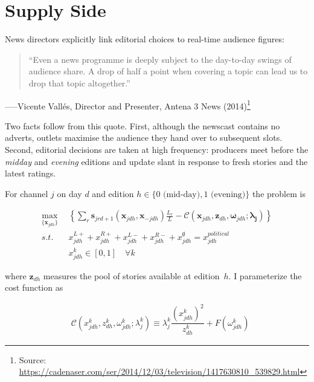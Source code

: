 \documentclass[12pt]{article}
\begin{document}
\section{Supply Side}


\label{sec:supply}

News directors explicitly link editorial choices to real-time audience figures:

\begin{quote}
	“Even a news programme is deeply subject to the day-to-day swings of audience share.  
	A drop of half a point when covering a topic can lead us to drop that topic altogether.”
\end{quote}
\hspace*{\fill}\small–––Vicente Vallés, Director and Presenter, Antena 3 News (2014)\footnote{Source: \url{https://cadenaser.com/ser/2014/12/03/television/1417630810_539829.html}}

Two facts follow from this quote. First, although the newscast contains no adverts, outlets maximise the audience they hand over to subsequent slots. Second, editorial decisions are taken at high frequency: producers meet before the \emph{midday} and \emph{evening} editions and update slant in response to fresh stories and the latest ratings.


For channel $j$ on day $d$ and edition $h\in\{0\text{ (mid-day)},1\text{ (evening)}\}$ the problem is



\begin{equation}\label{eq:payoffs}
	\begin{aligned}
		\max_{\{\mathbf{x}_{jdh}\}}   & \left\{   \sum_{r}\bm{s}_{jrd+1}(\bm{x}_{jdh}, \bm{x}_{-jdh})\frac{L_r}{L} -  \mathcal{C}\left(  \bm{x}_{jdh},\bm{z}_{dh}, \bm{\omega}_{jdh}; \bm{\lambda_j}   \right)    \right\}\\
		s.t.   \quad &   x_{jdh}^{L+} +x_{jdh}^{R+} + x_{jdh}^{L-} + x_{jdh}^{R-} + x_{jdh}^{\emptyset} = x_{jdh}^{political}\\
		& x_{jdh}^k \in [0,1] \quad \forall k
	\end{aligned}
\end{equation} 






where $\bm z_{dh}$ measures the pool of stories available at edition~$h$.  
I parameterize the cost function as

\begin{equation*}\label{}
	\begin{aligned}
		& \mathcal{C}(x_{jdh}^k,z_{dh}^k,\omega^k_{jdh}; \lambda_j^k )\equiv   \lambda_j^k  \dfrac{(x_{jdh}^k)^2}{z_{dh}^k} + F(\omega^k_{jdh})
	\end{aligned}
\end{equation*} 
\end{document}
